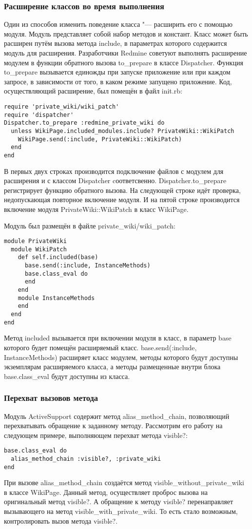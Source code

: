 \subsubsection{Расширение классов во время выполнения} 
Один из способов изменить поведение класса "--- расширить его с помощью модуля.
Модуль представляет собой набор методов и констант. Класс может быть расширен
путём вызова метода include, в параметрах которого содержится модуль для
расширения. Разработчики Redmine советуют выполнять расширение модулем в
функции обратного вызова to\_prepare в классе Dispatcher. Функция to\_prepare
вызывается единожды при запуске приложение или при каждом запросе, в
зависимости от того, в каком режиме запущено приложение. Код, осуществляющий
расширение, был помещён в файл init.rb:
\small{\begin{lstlisting}
require 'private_wiki/wiki_patch'
require 'dispatcher'
Dispatcher.to_prepare :redmine_private_wiki do
  unless WikiPage.included_modules.include? PrivateWiki::WikiPatch
    WikiPage.send(:include, PrivateWiki::WikiPatch)
  end 
end
\end{lstlisting}}
В первых двух строках производится подключение файлов с модулем для расширения
и с классом Dispatcher cоответсвенно. Dispatcher.to\_prepare регистрирует
функцию обратного вызова. На следующей строке идёт проверка, недопускающая
повторное включение модуля. И на пятой строке производится включение модуля
PrivateWiki::WikiPatch в класс WikiPage.

Модуль был размещён в файле private\_wiki/wiki\_patch:
\small{\begin{lstlisting}
module PrivateWiki
  module WikiPatch
    def self.included(base)
      base.send(:include, InstanceMethods)
      base.class_eval do
      end
    end
    module InstanceMethods
    end
  end
end
\end{lstlisting}}
Метод included вызывается при включении модуля в класс, в параметр base
которого будет помещён расширяемый класс. base.send(:include, InstanceMethods)
расширяет класс модулем, методы которого будут доступны экземплярам
расширяемого класса, а методы размещенные внутри блока base.class\_eval будут
доступны из класса.

\subsubsection{Перехват вызовов метода}
Модуль ActiveSupport содержит метод alias\_method\_chain, позволяющий
перехватывать обращение к заданному методу. Рассмотрим его работу на следующем
примере, выполняющем перехват метода visible?:
\small{\begin{lstlisting}
base.class_eval do
  alias_method_chain :visible?, :private_wiki
end
\end{lstlisting}}
При вызове alias\_method\_chain создаётся метод visible\_without\_private\_wiki
в классе WikiPage. Данный метод, осуществляет проброс вызова на оригинальный
метод visible?. А обращение к методу visible? перенаправляет вызывающего на
метод visible\_with\_private\_wiki. То есть стало возможным, контролировать
вызов метода visible?.

